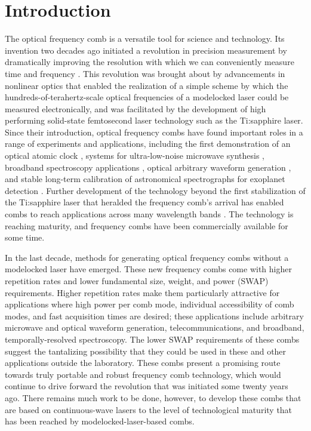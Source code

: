  \chapter{Introduction}
\label{chap:introduction}

The optical frequency comb is a versatile tool for science and technology. Its invention two decades ago initiated a revolution in precision measurement by dramatically improving the resolution with which we can conveniently measure time and frequency \cite{Diddams2000,Jones2000,Udem2002,Hall2006,Hansch2006}. This revolution was brought about by advancements in nonlinear optics \cite{Ranka2000} that enabled the realization of a simple scheme by which the hundreds-of-terahertz-scale optical frequencies of a modelocked laser could be measured electronically, and was facilitated by the development of high performing solid-state femtosecond laser technology such as the Ti:sapphire laser. Since their introduction, optical frequency combs have found important roles in a range of experiments and applications, including the first demonstration of an optical atomic clock \cite{Diddams2001}, systems for ultra-low-noise microwave synthesis \cite{Fortier2011}, broadband spectroscopy applications \cite{Diddams2007,Coddington2016}, optical arbitrary waveform generation \cite{Cundiff2010}, and stable long-term calibration of astronomical spectrographs for exoplanet detection \cite{Steinmetz2008}. Further development of the technology beyond the first stabilization of the Ti:sapphire laser that heralded the frequency comb's arrival has enabled combs to reach applications across many wavelength bands \cite{Washburn2004a,Gohle2005b,Diddams2010,Faist2016}. The technology is reaching maturity, and frequency combs have been commercially available for some time.

In the last decade, methods for generating optical frequency combs without a modelocked laser have emerged. These new frequency combs come with higher repetition rates and lower fundamental size, weight, and power (SWAP) requirements. Higher repetition rates make them particularly attractive for applications where high power per comb mode, individual accessibility of comb modes, and fast acquisition times are desired; these applications include arbitrary microwave and optical waveform generation, telecommunications, and broadband, temporally-resolved spectroscopy. The lower SWAP requirements of these combs suggest the tantalizing possibility that they could be used in these and other applications outside the laboratory. These combs present a promising route towards truly portable and robust frequency comb technology, which would continue to drive forward the revolution that was initiated some twenty years ago. There remains much work to be done, however, to develop these combs that are based on continuous-wave lasers to the level of technological maturity that has been reached by modelocked-laser-based combs.

